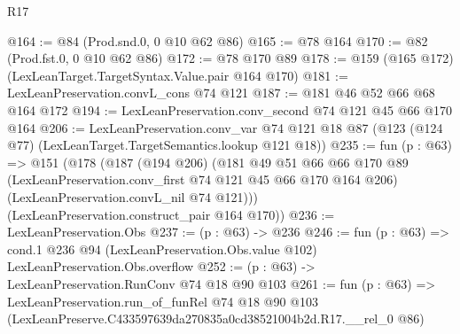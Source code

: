 \begin{lexlean}{R17}
\begin{coremodule}
@164 := @84 (Prod.snd.{0, 0} @10 @62 @86)
@165 := @78 @164
@170 := @82 (Prod.fst.{0, 0} @10 @62 @86)
@172 := @78 @170 @89
@178 := @159 (@165 @172) (LexLeanTarget.TargetSyntax.Value.pair @164 @170)
@181 := LexLeanPreservation.convL_cons @74 @121
@187 := @181 @46 @52 @66 @68 @164 @172
@194 := LexLeanPreservation.conv_second @74 @121 @45 @66 @170 @164
@206 := LexLeanPreservation.conv_var
    @74
    @121
    @18
    @87
    (@123 (@124 @77) (LexLeanTarget.TargetSemantics.lookup @121 @18))
@235 := fun (p : @63) =>
  @151
    (@178
      (@187
        (@194 @206)
        (@181
          @49
          @51
          @66
          @66
          @170
          @89
          (LexLeanPreservation.conv_first @74 @121 @45 @66 @170 @164 @206)
          (LexLeanPreservation.convL_nil @74 @121)))
      (LexLeanPreservation.construct_pair @164 @170))
@236 := LexLeanPreservation.Obs
@237 := (p : @63) -> @236
@246 := fun (p : @63) =>
  cond.{1} @236 @94 (LexLeanPreservation.Obs.value @102) LexLeanPreservation.Obs.overflow
@252 := (p : @63) -> LexLeanPreservation.RunConv @74 @18 @90 @103
@261 := fun (p : @63) =>
  LexLeanPreservation.run_of_funRel
    @74
    @18
    @90
    @103
    (LexLeanPreserve.C433597639da270835a0cd38521004b2d.R17.__rel_0 @86)
\end{coremodule}
\end{lexlean}
